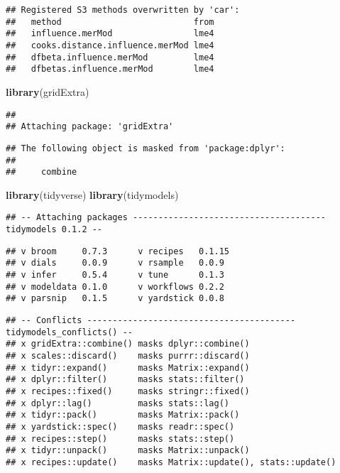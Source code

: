 \documentclass[
]{article}
\newenvironment{Shaded}{\begin{snugshade}}{\end{snugshade}}
\newcommand{\KeywordTok}[1]{\textcolor[rgb]{0.13,0.29,0.53}{\textbf{#1}}}
\newcommand{\NormalTok}[1]{#1}
\begin{document}
\begin{verbatim}
## Registered S3 methods overwritten by 'car':
##   method                          from
##   influence.merMod                lme4
##   cooks.distance.influence.merMod lme4
##   dfbeta.influence.merMod         lme4
##   dfbetas.influence.merMod        lme4
\end{verbatim}

\begin{Shaded}
\begin{Highlighting}[]
\KeywordTok{library}\NormalTok{(gridExtra)}
\end{Highlighting}
\end{Shaded}

\begin{verbatim}
## 
## Attaching package: 'gridExtra'
\end{verbatim}

\begin{verbatim}
## The following object is masked from 'package:dplyr':
## 
##     combine
\end{verbatim}

\begin{Shaded}
\begin{Highlighting}[]
\KeywordTok{library}\NormalTok{(tidyverse)}
\KeywordTok{library}\NormalTok{(tidymodels)}
\end{Highlighting}
\end{Shaded}

\begin{verbatim}
## -- Attaching packages -------------------------------------- tidymodels 0.1.2 --
\end{verbatim}

\begin{verbatim}
## v broom     0.7.3      v recipes   0.1.15
## v dials     0.0.9      v rsample   0.0.9 
## v infer     0.5.4      v tune      0.1.3 
## v modeldata 0.1.0      v workflows 0.2.2 
## v parsnip   0.1.5      v yardstick 0.0.8
\end{verbatim}

\begin{verbatim}
## -- Conflicts ----------------------------------------- tidymodels_conflicts() --
## x gridExtra::combine() masks dplyr::combine()
## x scales::discard()    masks purrr::discard()
## x tidyr::expand()      masks Matrix::expand()
## x dplyr::filter()      masks stats::filter()
## x recipes::fixed()     masks stringr::fixed()
## x dplyr::lag()         masks stats::lag()
## x tidyr::pack()        masks Matrix::pack()
## x yardstick::spec()    masks readr::spec()
## x recipes::step()      masks stats::step()
## x tidyr::unpack()      masks Matrix::unpack()
## x recipes::update()    masks Matrix::update(), stats::update()
\end{verbatim}
\end{document}
